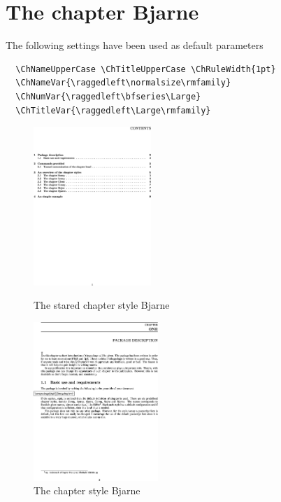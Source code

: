 \documentclass{report}
\begin{document}
    \section{The chapter Bjarne}
    The following settings have been used as default parameters\\
    {\small\begin{verbatim}
  \ChNameUpperCase \ChTitleUpperCase \ChRuleWidth{1pt}
  \ChNameVar{\raggedleft\normalsize\rmfamily}
  \ChNumVar{\raggedleft\bfseries\Large}
  \ChTitleVar{\raggedleft\Large\rmfamily}
     \end{verbatim}}
    \begin{figure}[h]
      \begin{minipage}{7 cm}
        \centerline{\includegraphics[height=6cm]{Bjarnes.eps}} 
        \caption{The stared chapter style Bjarne}
      \end{minipage}\hfill
      \begin{minipage}{7 cm}
        \centerline{\includegraphics[height=6cm]{Bjarne.eps}}
        \caption{The chapter style Bjarne}
      \end{minipage}\hfill
    \end{figure}
\end{document}
